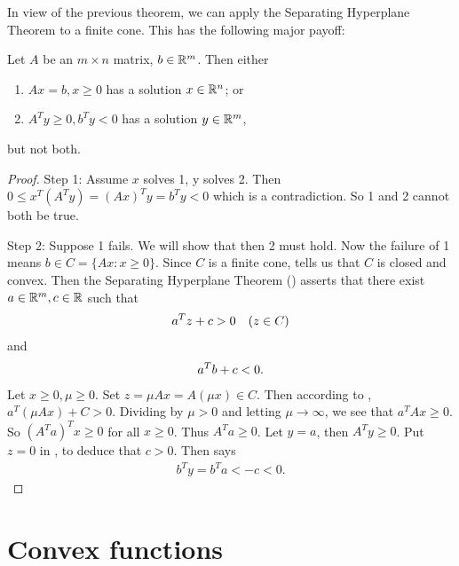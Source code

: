 In view of the previous theorem, we can apply the Separating Hyperplane
Theorem to a finite cone. 
This has the following major payoff:

\begin{theorem}
Let $A$ be an $m \times n$ matrix, $b \in \mathbb{R}^m$.
Then either 
\begin{enumerate}
    \item $A x = b, x \ge 0$ has a solution $x \in \mathbb{R}^n$; or
    \item $A^T y \ge 0, b^T y < 0$ has a solution $y \in \mathbb{R}^m$,
\end{enumerate}
but not both.
\end{theorem}

\begin{proof}
Step 1:
Assume $x$ solves 1, y solves 2.
Then $0 \le x^T (A^T y) = (Ax)^T y = b^T y < 0$ which is a contradiction.
So 1 and 2 cannot both be true.

Step 2:
Suppose 1 fails.
We will show that then 2 must hold.
Now the failure of 1 means $b \in C = \{ Ax : x \ge 0\}$.
Since $C$ is a finite cone,  tells us  that $C$ is closed and convex.
Then the Separating Hyperplane Theorem () asserts that there exist $a \in \mathbb{R}^m, c \in \mathbb{R}$ such that 
\begin{align}
a^T z + c > 0 \quad (z \in C) \labeq{proof_farkas_alternative_eq_1}
\end{align}
and 
\begin{align}
a^T b + c < 0. \labeq{proof_farkas_alternative_eq_2}
\end{align}
Let $x \ge 0, \mu \ge 0$.
Set $z = \mu A x = A (\mu x) \in C$.
Then according to , $a^T (\mu A x) + C > 0$.
Dividing by $\mu > 0$ and letting $\mu \to \infty$, we see that $a^T Ax \ge 0$.
So $(A^T a)^T x \ge 0$ for all $x \ge 0$.
Thus $A^T a \ge 0$.
Let $y = a$, then $A^T y \ge 0$.
Put $z = 0$ in , to deduce that $c > 0$.
Then  says
\begin{align}
b^T y = b^T a < -c < 0.
\end{align}
\end{proof}

\section{Convex functions}

